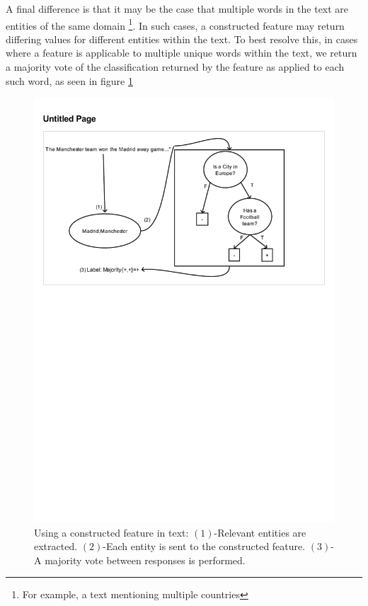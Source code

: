\documentclass[twoside,11pt]{article}
\theoremstyle{definition}
\begin{document}
A final difference is that it may be the case that multiple words in the text are entities of the same domain \footnote{For example, a text mentioning multiple countries}. In such cases, a constructed feature may return differing values for different entities within the text. To best resolve this, in cases where a feature is applicable to multiple unique words within the text, we return a majority vote of the classification returned by the feature as applied to each such word, as seen in figure \ref{figure5}

\begin{figure}[t]
	\centering
	\includegraphics[width=\linewidth]{fig5.pdf}
	\caption{Using a constructed feature in text: $(1)$-Relevant entities are extracted. $(2)$-Each entity is sent to the constructed feature. $(3)$-A majority vote between responses is performed.}
	\label{figure5}
\end{figure}
\end{document}
